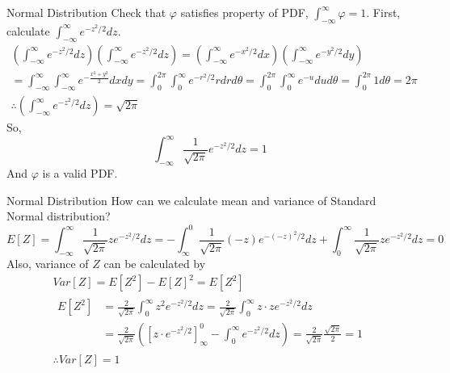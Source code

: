 \documentclass[8pt]{beamer}
\begin{document}
\begin{frame}{Normal Distribution}
    Check that $\varphi$ satisfies property of PDF, $\int_{-\infty}^\infty \varphi =1$. First, calculate $\int_{-\infty}^\infty e^{-z^2/2}dz$.
    \[
    \begin{gathered}
        \left( \int_{-\infty}^\infty e^{-z^2/2} dz \right)\left( \int_{-\infty}^\infty e^{-z^2/2} dz \right) =  \left( \int_{-\infty}^\infty e^{-x^2/2} dx \right)\left( \int_{-\infty}^\infty e^{-y^2/2} dy \right)\\
        = \int_{-\infty}^\infty \int_{-\infty}^\infty e^{-\frac{x^2 + y^2}{2}} dx dy = \int_{0}^{2\pi} \int_{0}^{\infty} e^{-r^2 /2} r dr d\theta = \int_{0}^{2\pi} \int_0^\infty e^{-u} du d\theta =\int_0^{2\pi} 1 d\theta = 2\pi  \\
        \therefore  \left( \int_{-\infty}^\infty e^{-z^2/2} dz \right) = \sqrt{2\pi}
    \end{gathered}
    \]
    So,
    \[
    \int_{-\infty}^{\infty} \frac{1}{\sqrt{2\pi}}e^{-z^2/2} dz = 1
    \]
    And $\varphi$ is a valid PDF.

\end{frame}

\begin{frame}{Normal Distribution}
    How can we calculate mean and variance of Standard Normal distribution?
    \[E[Z] = \int_{-\infty}^\infty \frac{1}{\sqrt{2\pi}} z e^{-z^2/2} dz = -\int_{\infty}^0 \frac{1}{\sqrt{2\pi}} (-z)e^{-(-z)^2/2} dz + \int_0^\infty \frac{1}{\sqrt{2\pi}}ze^{-z^2/2}dz = 0\]
    Also, variance of $Z$ can be calculated by
    \[
    \begin{gathered}
        Var[Z] = E[Z^2] - E[Z]^2 = E[Z^2]\\
        \begin{aligned}
            E[Z^2] &=  \frac{2}{\sqrt{2\pi}}\int_0^{\infty}z^2 e^{-z^2/2} dz = \frac{2}{\sqrt{2\pi}}\int_0^\infty z\cdot ze^{-z^2/2}dz \\
            &= \frac{2}{\sqrt{2\pi}}\left(\left[z \cdot e^{- z^2 /2} \right]_\infty^0 -\int_0^\infty e^{-z^2/2} dz\right) = \frac{2}{\sqrt{2\pi}}\frac{\sqrt{2\pi}}{2} = 1
        \end{aligned}\\
        \therefore Var[Z] = 1
    \end{gathered}
    \]
\end{frame}
\end{document}
